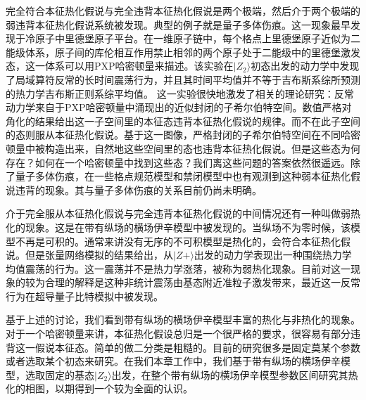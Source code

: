 完全符合本征热化假说与完全违背本征热化假说是两个极端，然后介于两个极端的弱违背本征热化假说系统被发现。典型的例子就是量子多体伤痕。这一现象最早发现于冷原子中里德堡原子平台\cite{bernien2017probing}。在一维原子链中，每个格点上里德堡原子近似为二能级体系，原子间的库伦相互作用禁止相邻的两个原子处于二能级中的里德堡激发态，这一体系可以用PXP哈密顿量来描述。该实验在$|Z_2\rangle$初态出发的动力学中发现了局域算符反常的长时间震荡行为，并且其时间平均值并不等于吉布斯系综所预测的热力学吉布斯正则系综平均值。
这一实验很快地激发了相关的理论研究\cite{turner2018weak,Turner2018quantum,Ho2019periodic,Choi2019emergent,Michailidis2020slow,serbyn2021quantum,Yao2022quantum}：反常动力学来自于PXP哈密顿量中涌现出的近似封闭的子希尔伯特空间。数值严格对角化的结果给出这一子空间里的本征态违背本征热化假说的规律。而不在此子空间的态则服从本征热化假说。基于这一图像，严格封闭的子希尔伯特空间在不同哈密顿量中被构造出来\cite{Shiraishi2017Systematic,Moudgalya2018exact,Moudgalya2018entanglement,Khemani2020lacalization,Moudgalya2020eta,Lin2019Exact,Schecter2019weak,Mark2020unified,Mark2020eta,Pakrouski2020many,Ren2021quasi,ODea2020from}，自然地这些空间里的态也违背本征热化假说。但是这些态为何存在？如何在一个哈密顿量中找到这些态？我们离这些问题的答案依然很遥远。除了量子多体伤痕，在一些格点规范模型\cite{magnifico2020real,Chanda2020confinement,Borla2020confined}和禁闭模型\cite{Nandkishore2017many,kormos2017real,Robinson2019signature,Yang2020Hilbert,Castro2020entanglement}中也有观测到这种弱本征热化假说违背的现象。其与量子多体伤痕的关系目前仍尚未明确\cite{serbyn2021quantum}。


介于完全服从本征热化假说与完全违背本征热化假说的中间情况还有一种叫做弱热化的现象\cite{banuls2011strong}。这是在带有纵场的横场伊辛模型中被发现的。当纵场不为零时候，该模型不再是可积的。通常来讲没有无序的不可积模型是热化的，会符合本征热化假说。但是张量网络模拟的结果给出，从$|Z+\rangle$出发的动力学表现出一种围绕热力学均值震荡的行为。这一震荡并不是热力学涨落，被称为弱热化现象。目前对这一现象的较为合理的解释是这种非统计震荡由基态附近准粒子激发带来\cite{Lin2017quasiparticle}，最近这一反常行为在超导量子比特模拟中被发现\cite{Chen2021observation}。

基于上述的讨论，我们看到带有纵场的横场伊辛模型丰富的热化与非热化的现象。对于一个哈密顿量来讲，本征热化假设总归是一个很严格的要求，很容易有部分违背这一假说本征态。简单的做二分类是粗糙的。目前的研究很多是固定莫某个参数或者选取某个初态来研究。在我们本章工作中，我们基于带有纵场的横场伊辛模型，选取固定的基态$|Z_2\rangle$出发，在整个带有纵场的横场伊辛模型参数区间研究其热化的相图，以期得到一个较为全面的认识。


